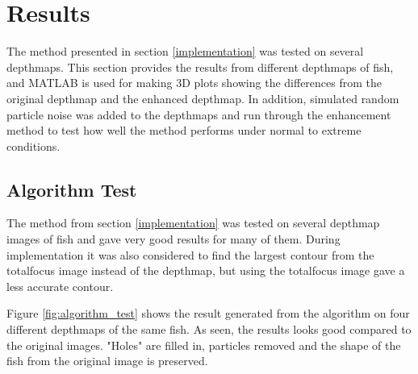 \section{Results}\label{results}

The method presented in section \ref{implementation} was tested on several depthmaps. This section provides the results from different depthmaps of fish, and MATLAB is used for making 3D plots showing the differences from the original depthmap and the enhanced depthmap. 
In addition, simulated random particle noise was added to the depthmaps and run through the enhancement method to test how well the method performs under normal to extreme conditions.


\subsection{Algorithm Test}

The method from section \ref{implementation} was tested on several depthmap images of fish and gave very good results for many of them. During implementation it was also considered to find the largest contour from the totalfocus image instead of the depthmap, but using the totalfocus image gave a less accurate contour. 

Figure \ref{fig:algorithm_test} shows the result generated from the algorithm on four different depthmaps of the same fish.
As seen, the results looks good compared to the original images. "Holes" are filled in, particles removed and the shape of the fish from the original image is preserved. 


